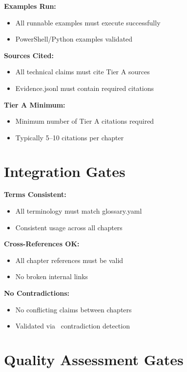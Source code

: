 \textbf{Examples Run:}
\begin{itemize}
    \item All runnable examples must execute successfully
    \item PowerShell/Python examples validated
\end{itemize}

\textbf{Sources Cited:}
\begin{itemize}
    \item All technical claims must cite Tier A sources
    \item Evidence.jsonl must contain required citations
\end{itemize}

\textbf{Tier A Minimum:}
\begin{itemize}
    \item Minimum number of Tier A citations required
    \item Typically 5--10 citations per chapter
\end{itemize}

\section*{Integration Gates}

\textbf{Terms Consistent:}
\begin{itemize}
    \item All terminology must match glossary.yaml
    \item Consistent usage across all chapters
\end{itemize}

\textbf{Cross-References OK:}
\begin{itemize}
    \item All chapter references must be valid
    \item No broken internal links
\end{itemize}

\textbf{No Contradictions:}
\begin{itemize}
    \item No conflicting claims between chapters
    \item Validated via \seg\ contradiction detection
\end{itemize}

\section*{Quality Assessment Gates}

